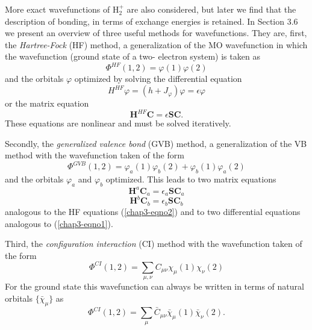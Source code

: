 More exact wavefunctions of H$^+_2$ are also considered, but later we find 
that the description of bonding, in terms of exchange energies is retained. In 
Section 3.6 we present an overview of three useful methods for 
wavefunctions. They are, first, the \emph{Hartree-Fock} (HF) method, a
generalization of the MO wavefunction in which the 
wavefunction (ground state of a two- electron system) is taken as
\begin{equation}
\Phi^{HF} ( 1 , 2 ) = \varphi ( 1 ) \varphi ( 2 )
\end{equation}
and the orbitals $\varphi$ optimized by solving the differential equation
\begin{equation}
H^{HF} \varphi = \left( h + J_{\varphi} \right) \varphi = \epsilon
\varphi
\label{chap3-eqno1}
\end{equation}
or the matrix equation
\begin{equation}
\mathbf{H}^{HF} \mathbf{C} = \epsilon \mathbf{S} 
\mathbf{C}.
\label{chap3-eqno2}
\end{equation}
These equations are nonlinear and must be solved iteratively.

Secondly, the \emph{generalized valence bond} (GVB) method, a
generalization of the VB method with the wavefunction taken of the
form
\begin{equation}
\Phi^{GVB} (1 , 2) = \varphi_a (1) \varphi_b (2) + \varphi_b (1) \varphi_a (2)
\end{equation}
and the orbitals $\varphi_a$ and $\varphi_b$ optimized. This leads to two 
matrix equations
\begin{equation}
\mathbf{H}^a \mathbf{C}_a = \epsilon_a \mathbf{S} \mathbf{C}_a
\end{equation}
\begin{equation}
\mathbf{H}^b \mathbf{C}_b = \epsilon_b \mathbf{S} \mathbf{C}_b
\end{equation}
analogous to the HF equations (\ref{chap3-eqno2}) and to two
differential equations analogous to (\ref{chap3-eqno1}).

Third, the \emph{configuration interaction} (CI) method with the
wavefunction taken of the form
\begin{equation}
\Phi^{CI} (1, 2) = \sum_{\mu , \nu} C_{\mu \nu} \chi_{\mu} ( 1 ) 
\chi_{\nu} ( 2 )
\end{equation}
For the ground state this wavefunction can always be written in terms of
natural orbitals $\{ {\bar{\chi}}_{\mu} \}$ as
\begin{equation}
\Phi^{CI} (1, 2) = \sum_{\mu} {\bar{C}}_{\mu \nu} {\bar{\chi}}_{\mu} ( 1 ) 
{\bar{\chi}}_{\nu} ( 2 ) .
\end{equation}

